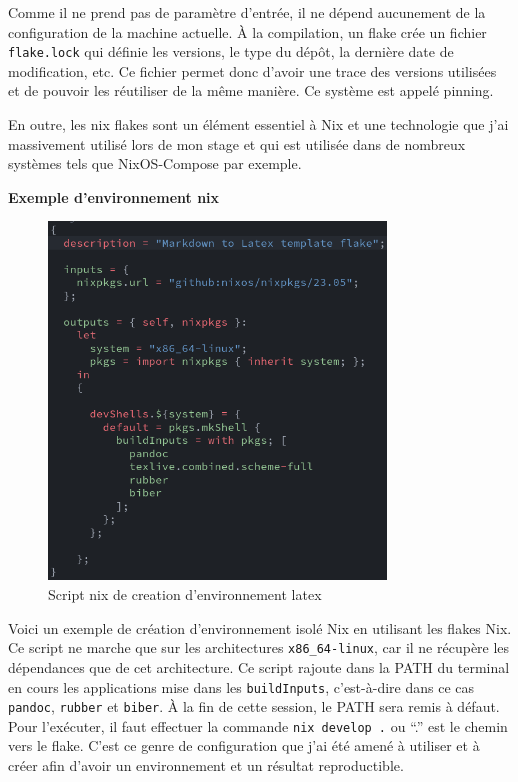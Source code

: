 \documentclass[a4paper,french,12pt, titlepage]{article}
\begin{document}
Comme il ne prend pas de paramètre d'entrée, il ne dépend aucunement de
la configuration de la machine actuelle. À la compilation, un flake crée
un fichier \texttt{flake.lock} qui définie les versions, le type du
dépôt, la dernière date de modification, etc. Ce fichier permet donc
d'avoir une trace des versions utilisées et de pouvoir les réutiliser de
la même manière. Ce système est appelé \gls{pinning}.\newline

En outre, les nix flakes sont un élément essentiel à Nix et une
technologie que j'ai massivement utilisé lors de mon stage et qui est
utilisée dans de nombreux systèmes tels que NixOS-Compose par
exemple.\newline

\textbf{Exemple d'environnement nix}\newline

\begin{figure}[h]
\centering
\includegraphics[width=0.8\textwidth,height=0.8\textheight,keepaspectratio]{images/flakebasenix.png}
\caption{Script nix de creation d'environnement latex}
\end{figure}

Voici un exemple de création d'environnement isolé Nix en utilisant les
flakes Nix. Ce script ne marche que sur les architectures
\texttt{x86\_64-linux}, car il ne récupère les dépendances que de cet
architecture. Ce script rajoute dans la PATH du terminal en cours les
applications mise dans les \texttt{buildInputs}, c'est-à-dire dans ce
cas \texttt{pandoc}, \texttt{rubber} et \texttt{biber}. À la fin de
cette session, le PATH sera remis à défaut. Pour l'exécuter, il faut
effectuer la commande \texttt{nix\ develop\ .} ou ``.'' est le chemin
vers le flake. C'est ce genre de configuration que j'ai été amené à
utiliser et à créer afin d'avoir un environnement et un résultat
reproductible.\newline
\end{document}
